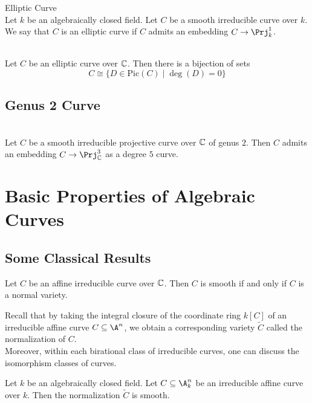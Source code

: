 \documentclass[a4paper]{article}
\begin{document}
\begin{defn}{Elliptic Curve}{}\\
Let $k$ be an algebraically closed field. Let $C$ be a smooth irreducible curve over $k$. We say that $C$ is an elliptic curve if $C$ admits an embedding $C\to\Prj_k^1$. 
\end{defn}

\begin{prp}{}{}\\
Let $C$ be an elliptic curve over $\mathbb{C}$. Then there is a bijection of sets $$C\cong\{D\in\text{Pic}(C)\;|\;\deg(D)=0\}$$
\end{prp}

\subsection{Genus 2 Curve}
\begin{prp}{}{}\\
Let $C$ be a smooth irreducible projective curve over $\mathbb{C}$ of genus $2$. Then $C$ admits an embedding $C\to\Prj_\C^3$ as a degree $5$ curve. 
\end{prp}




\pagebreak
\section{Basic Properties of Algebraic Curves}
\subsection{Some Classical Results}
\begin{prp}{}{} Let $C$ be an affine irreducible curve over $\mathbb{C}$. Then $C$ is smooth if and only if $C$ is a normal variety. 
\end{prp}

Recall that by taking the integral closure of the coordinate ring $k[C]$ of an irreducible affine curve $C\subseteq\A^n$, we obtain a corresponding variety $\widetilde{C}$ called the normalization of $C$. \\

Moreover, within each birational class of irreducible curves, one can discuss the isomorphism classes of curves. 

\begin{crl}{}{} Let $k$ be an algebraically closed field. Let $C\subseteq\A_k^n$ be an irreducible affine curve over $k$. Then the normalization $\widetilde{C}$ is smooth. 
\end{crl}
\end{document}
